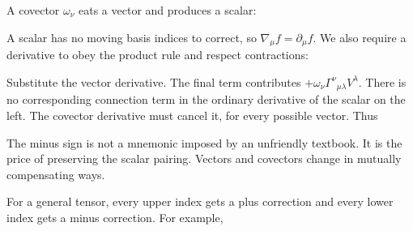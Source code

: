 \documentclass[
  11pt,
  letterpaper,
  oneside,
  openany]{scrbook}
\begin{document}
A covector \(\omega_\nu\) eats a vector and produces a scalar:

\begin{center}
\begingroup
{}
\ifdim\wd\grmathbox>\linewidth
\resizebox{\linewidth}{!}{\usebox{\grmathbox}}
\else\usebox{\grmathbox}\fi
\endgroup
\end{center}

A scalar has no moving basis indices to correct, so
\(\nabla_\mu f=\partial_\mu f\). We also require a derivative to obey
the product rule and respect contractions:

\begin{center}
\begingroup
{}
\ifdim\wd\grmathbox>\linewidth
\resizebox{\linewidth}{!}{\usebox{\grmathbox}}
\else\usebox{\grmathbox}\fi
\endgroup
\end{center}

Substitute the vector derivative. The final term contributes
\(+\omega_\nu\Gamma^\nu{}_{\mu\lambda}V^\lambda\). There is no
corresponding connection term in the ordinary derivative of the scalar
on the left. The covector derivative must cancel it, for every possible
vector. Thus

\begin{center}
\begingroup
{}
\ifdim\wd\grmathbox>\linewidth
\resizebox{\linewidth}{!}{\usebox{\grmathbox}}
\else\usebox{\grmathbox}\fi
\endgroup
\end{center}

The minus sign is not a mnemonic imposed by an unfriendly textbook. It
is the price of preserving the scalar pairing. Vectors and covectors
change in mutually compensating ways.

For a general tensor, every upper index gets a plus correction and every
lower index gets a minus correction. For example,

\begin{center}
\begingroup
{}
\ifdim\wd\grmathbox>\linewidth
\resizebox{\linewidth}{!}{\usebox{\grmathbox}}
\else\usebox{\grmathbox}\fi
\endgroup
\end{center}
\end{document}
